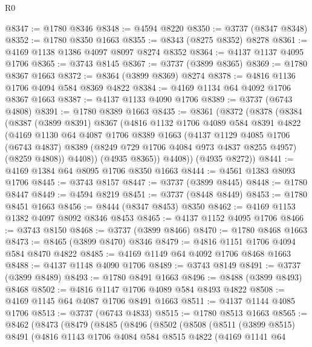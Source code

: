 \begin{lexlean}{R0}
\begin{coremodule}
@8347 := @1780 @8346
@8348 := @4594 @8220
@8350 := @3737 (@8347 @8348)
@8352 := @1780 @8350 @1663
@8355 := @8343 (@8275 @8352) @8278
@8361 := @4169 @1138 @1386 @4097 @8097 @8274 @8352
@8364 := @4137 @1137 @4095 @1706
@8365 := @3743 @8145
@8367 := @3737 (@3899 @8365)
@8369 := @1780 @8367 @1663
@8372 := @8364 (@3899 @8369) @8274
@8378 := @4816 @1136 @1706 @4094 @584 @8369 @4822
@8384 := @4169 @1134 @64 @4092 @1706 @8367 @1663
@8387 := @4137 @1133 @4090 @1706
@8389 := @3737 (@6743 @4808)
@8391 := @1780 @8389 @1663
@8435 := @8361
    (@8372
      (@8378
        (@8384
          (@8387
            (@3899 @8391)
            @8367
            (@4816
              @1132
              @1706
              @4089
              @584
              @8391
              @4822
              (@4169
                @1130
                @64
                @4087
                @1706
                @8389
                @1663
                (@4137
                  @1129
                  @4085
                  @1706
                  (@6743 @4837)
                  @8389
                  (@8249 @729 @1706 @4084 @973 @4837 @8255 @4957)
                  (@8259 @4808))
                @4408))
            (@4935 @8365))
          @4408))
      (@4935 @8272))
@8441 := @4169 @1384 @64 @8095 @1706 @8350 @1663
@8444 := @4561 @1383 @8093 @1706
@8445 := @3743 @8157
@8447 := @3737 (@3899 @8445)
@8448 := @1780 @8447
@8449 := @4594 @8219
@8451 := @3737 (@8448 @8449)
@8453 := @1780 @8451 @1663
@8456 := @8444 (@8347 @8453) @8350
@8462 := @4169 @1153 @1382 @4097 @8092 @8346 @8453
@8465 := @4137 @1152 @4095 @1706
@8466 := @3743 @8150
@8468 := @3737 (@3899 @8466)
@8470 := @1780 @8468 @1663
@8473 := @8465 (@3899 @8470) @8346
@8479 := @4816 @1151 @1706 @4094 @584 @8470 @4822
@8485 := @4169 @1149 @64 @4092 @1706 @8468 @1663
@8488 := @4137 @1148 @4090 @1706
@8489 := @3743 @8149
@8491 := @3737 (@3899 @8489)
@8493 := @1780 @8491 @1663
@8496 := @8488 (@3899 @8493) @8468
@8502 := @4816 @1147 @1706 @4089 @584 @8493 @4822
@8508 := @4169 @1145 @64 @4087 @1706 @8491 @1663
@8511 := @4137 @1144 @4085 @1706
@8513 := @3737 (@6743 @4833)
@8515 := @1780 @8513 @1663
@8565 := @8462
    (@8473
      (@8479
        (@8485
          (@8496
            (@8502
              (@8508
                (@8511
                  (@3899 @8515)
                  @8491
                  (@4816
                    @1143
                    @1706
                    @4084
                    @584
                    @8515
                    @4822
                    (@4169
                      @1141
                      @64

\end{coremodule}
\end{lexlean}
